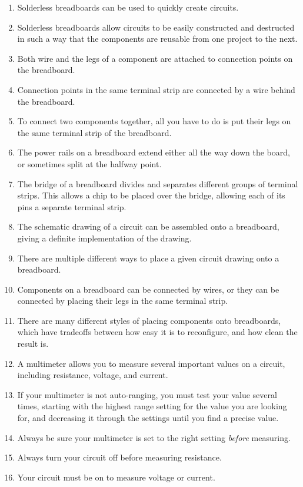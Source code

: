 \begin{enumerate}
\item Solderless breadboards can be used to quickly create circuits.
\item Solderless breadboards allow circuits to be easily constructed and destructed in such a way that the components are reusable from one project to the next.
\item Both wire and the legs of a component are attached to connection points on the breadboard.
\item Connection points in the same terminal strip are connected by a wire behind the breadboard.
\item To connect two components together, all you have to do is put their legs on the same terminal strip of the breadboard.
\item The power rails on a breadboard extend either all the way down the board, or sometimes split at the halfway point.
\item The bridge of a breadboard divides and separates different groups of terminal strips.  This allows a chip to be placed over the bridge, allowing each of its pins a separate terminal strip.
\item The schematic drawing of a circuit can be assembled onto a breadboard, giving a definite implementation of the drawing.
\item There are multiple different ways to place a given circuit drawing onto a breadboard.
\item Components on a breadboard can be connected by wires, or they can be connected by placing their legs in the same terminal strip.
\item There are many different styles of placing components onto breadboards, which have tradeoffs between how easy it is to reconfigure, and how clean the result is.
\item A multimeter allows you to measure several important values on a circuit, including resistance, voltage, and current.
\item If your multimeter is not auto-ranging, you must test your value several times, starting with the highest range setting for the value you are looking for, and decreasing it through the settings until you find a precise value.
\item Always be sure your multimeter is set to the right setting \emph{before} measuring.
\item Always turn your circuit off before measuring resistance.
\item Your circuit must be on to measure voltage or current.

\end{enumerate}

